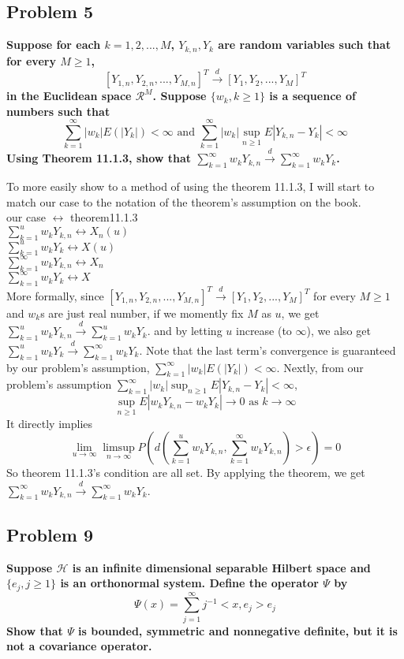 \documentclass{article}
\begin{document}
\subsection{Problem 5}
\textbf{
    Suppose for each $k=1,2,...,M$, $Y_{k,n}, Y_k$ are random variables such that for every $M\geq 1$,
    \[ [Y_{1,n},Y_{2,n},...,Y_{M,n}]^T\xrightarrow{d} [Y_1,Y_2,...,Y_M]^T\]
    in the Euclidean space $\mathcal{R}^M$. Suppose $\{w_k, k\geq 1\}$ is a sequence of numbers such that
    \[\sum_{k=1}^{\infty}|w_k| E(|Y_k|)<\infty \text{ and } \sum_{k=1}^{\infty}|w_k|\sup_{n\geq 1}E|Y_{k,n}-Y_k|<\infty\]
    Using Theorem 11.1.3, show that \(\sum_{k=1}^{\infty}w_kY_{k,n}\xrightarrow{d}\sum_{k=1}^{\infty}w_kY_k\).
}

To more easily show to a method of using the theorem 11.1.3, 
I will start to match our case to the notation of the theorem's assumption on the book. \\
our case $\leftrightarrow$ theorem11.1.3 \\
\(\sum_{k=1}^{u}w_kY_{k,n} \leftrightarrow X_n(u) \) \\
\(\sum_{k=1}^{u}w_kY_{k} \leftrightarrow X(u) \) \\
\(\sum_{k=1}^{\infty}w_kY_{k,n} \leftrightarrow X_n \) \\
\(\sum_{k=1}^{\infty}w_kY_{k} \leftrightarrow X \) \\

More formally, since \([Y_{1,n},Y_{2,n},...,Y_{M,n}]^T\xrightarrow{d} [Y_1,Y_2,...,Y_M]^T\) for every $M\geq1$ and
$w_k$s are just real number,
if we momently fix $M$ as $u$, we get \(\sum_{k=1}^{u}w_kY_{k,n}\xrightarrow{d}\sum_{k=1}^{u}w_kY_{k}\).
and by letting $u$ increase (to $\infty$), we also get 
\(\sum_{k=1}^{u}w_kY_{k}\xrightarrow{d}\sum_{k=1}^{\infty}w_kY_{k}\).
Note that the last term's convergence is guaranteed by our problem's assumption, \(\sum_{k=1}^{\infty}|w_k| E(|Y_k|)<\infty\).
Nextly, from our problem's assumption $\sum_{k=1}^{\infty}|w_k|\sup_{n\geq 1}E|Y_{k,n}-Y_k|<\infty$,
\[\sup_{n\geq 1}E|w_kY_{k,n}-w_kY_k|\rightarrow0 \text{ as } k\rightarrow\infty \]
It directly implies
\[\lim_{u\rightarrow\infty}\limsup_{n\rightarrow\infty}P(d(\sum_{k=1}^{u}w_kY_{k,n},\sum_{k=1}^{\infty}w_kY_{k,n})>\epsilon)=0\]
So theorem 11.1.3's condition are all set. By applying the theorem, we get
\(\sum_{k=1}^{\infty}w_kY_{k,n}\xrightarrow{d}\sum_{k=1}^{\infty}w_kY_k\).

\subsection{Problem 9}
\textbf{
    Suppose $\mathcal{H}$ is an infinite dimensional separable Hilbert space and $\{e_j,j\geq1\}$ is an orthonormal system.
    Define the operator $\Psi$ by
    \[\Psi(x)=\sum_{j=1}^{\infty}j^{-1}<x,e_j>e_j\]
    Show that $\Psi$ is bounded, symmetric and nonnegative definite, but it is not a covariance operator.
}
\end{document}
